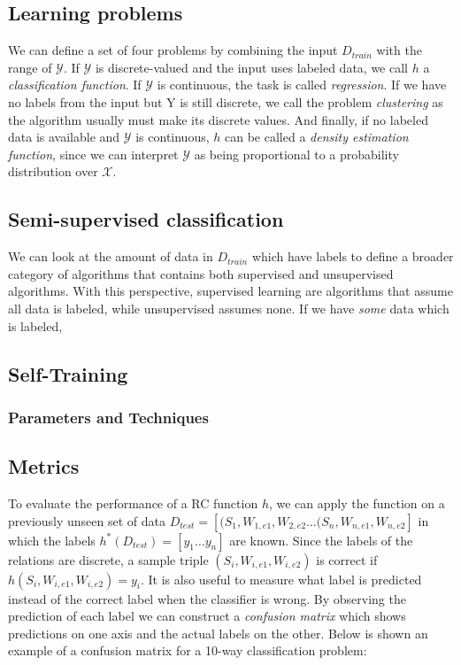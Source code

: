 \subsection{Learning problems}

We can define a set of four problems by combining the input $D_{train}$ with the range of $\mathcal{Y}$. If $\mathcal{Y}$ is discrete-valued and the input uses labeled data, we call $h$ a \emph{classification function}. If $\mathcal{Y}$ is continuous, the task is called \emph{regression}. If we have no labels from the input but Y is still discrete, we call the problem \emph{clustering} as the algorithm usually must make its discrete values. And finally, if no labeled data is available and $\mathcal{Y}$ is continuous, $h$ can be called a \emph{density estimation function}, since we can interpret $\mathcal{Y}$ as being proportional to a probability distribution over $\mathcal{X}$.

\subsection{Semi-supervised classification}

We can look at the amount of data in $D_{train}$ which have labels to define a broader category of algorithms that contains both supervised and unsupervised algorithms. With this perspective, supervised learning are algorithms that assume all data is labeled, while unsupervised assumes none. If we have \emph{some} data which is labeled,    


\subsection{Self-Training}

\subsubsection{Parameters and Techniques}

\subsection{Metrics}

To evaluate the performance of a RC function $h$, we can apply the function on a previously unseen set of data $D_{test} = [(S_1, W_{1,e1}, W_{2,e2} \ldots (S_n, W_{n,e1}, W_{n,e2}]$ in which the labels $h^*(D_{test}) = [y_1 \ldots y_n]$ are known. Since the labels of the relations are discrete, a sample triple $(S_i,W_{i,e1},W_{i,e2})$ is correct if $h(S_i,W_{i,e1},W_{i,e2}) = y_i$. 
It is also useful to measure what label is predicted instead of the correct label when the classifier is wrong.
By observing the prediction of each label we can construct a \emph{confusion matrix} which shows predictions on one axis and the actual labels on the other. Below is shown an example of a confusion matrix for a 10-way classification problem:

